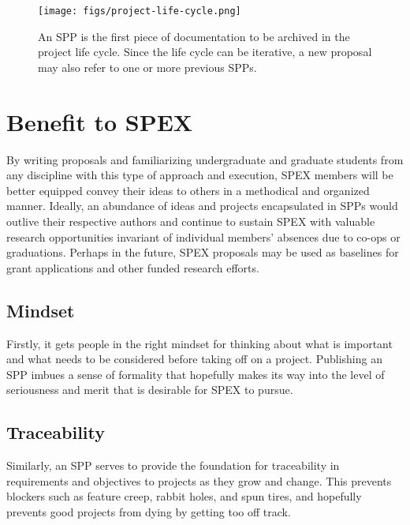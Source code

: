 \documentclass[journal]{SPEXformat}
\begin{document}
\begin{figure}
  \texttt{[image: figs/project-life-cycle.png]}
  \caption{An SPP is the first piece of documentation to be archived in the project life cycle. Since the life cycle can be iterative, a new proposal may also refer to one or more previous SPPs.}
\label{fig:lifecycle}
\end{figure}

\section{Benefit to SPEX}
\label{sec:benefit}
By writing proposals and familiarizing undergraduate and graduate students from any discipline with this type of approach and execution, SPEX members will be better equipped convey their ideas to others in a methodical and organized manner.
Ideally, an abundance of ideas and projects encapsulated in SPPs would outlive their respective authors and continue to sustain SPEX with valuable research opportunities invariant of individual members' absences due to co-ops or graduations.
Perhaps in the future, SPEX proposals may be used as baselines for grant applications and other funded research efforts.

\subsection{Mindset}
\label{subsec:mindset}
Firstly, it gets people in the right mindset for thinking about what is important and what needs to be considered before taking off on a project.
Publishing an SPP imbues a sense of formality that hopefully makes its way into the level of seriousness and merit that is desirable for SPEX to pursue.

\subsection{Traceability}
\label{subsec:traceability}
Similarly, an SPP serves to provide the foundation for traceability in requirements and objectives to projects as they grow and change.
This prevents blockers such as feature creep, rabbit holes, and spun tires, and hopefully prevents good projects from dying by getting too off track.
\end{document}
